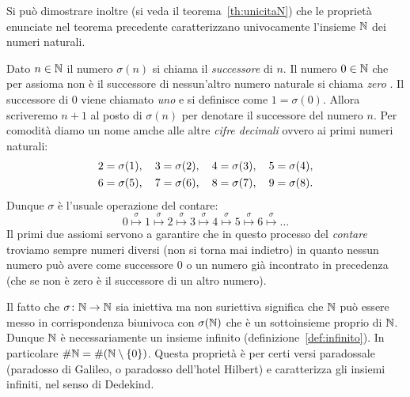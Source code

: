 Si può dimostrare inoltre (si veda il teorema~\ref{th:unicitaN}) che le proprietà 
enunciate nel teorema precedente caratterizzano univocamente l'insieme 
${\mathbb N}$ dei numeri naturali.

Dato $n\in {\mathbb N}$ il numero $\sigma(n)$ si chiama il \emph{successore}%
%
 di $n$. 
Il numero $0\in {\mathbb N}$ che per assioma non è il successore di nessun'altro 
numero naturale si chiama \emph{zero}%
%
. 
Il successore di $0$ viene chiamato \emph{uno} e si definisce 
come $1=\sigma(0)$. 
Allora scriveremo $n+1$ al posto di $\sigma(n)$ per denotare 
il successore del numero $n$.
Per comodità diamo un nome amche alle altre \emph{cifre decimali}%
%
ovvero ai primi numeri naturali:
\begin{equation}\label{eq:cifre}
\begin{gathered}
 2 = \sigma(1),\quad
 3 = \sigma(2),\quad 
 4 = \sigma(3),\quad
 5 = \sigma(4),\\ 
 6 = \sigma(5),\quad 
 7 = \sigma(6),\quad 
 8 = \sigma(7),\quad 
 9 = \sigma(8).
\end{gathered}
\end{equation}
Dunque $\sigma$ è l'usuale operazione del contare:
 \[
 0 \stackrel\sigma\mapsto 1 \stackrel\sigma\mapsto 2 \stackrel\sigma\mapsto 
 3 \stackrel\sigma\mapsto 4 \stackrel\sigma\mapsto 5 \stackrel\sigma\mapsto 
 6 \stackrel\sigma\mapsto \dots  
 \]
Il primi due assiomi servono a garantire che in questo processo del \emph{contare}%
%
troviamo sempre numeri diversi (non si torna mai indietro) in quanto nessun numero 
può avere come successore $0$ o un numero già incontrato in precedenza (che 
se non è zero è il successore di un altro numero).

Il fatto che $\sigma\colon {\mathbb N}\to {\mathbb N}$ sia iniettiva ma non suriettiva 
significa che ${\mathbb N}$ può essere messo in corrispondenza biunivoca con 
$\sigma({\mathbb N})$ che è un sottoinsieme proprio di ${\mathbb N}$.
Dunque ${\mathbb N}$ è necessariamente un insieme infinito 
(definizione~\ref{def:infinito}).
In particolare $\#{\mathbb N} = \#{\left( {\mathbb N} \setminus{\left\{ 0 \right\}} \right)}$.
Questa proprietà è per certi versi paradossale
(paradosso di Galileo, o paradosso dell'hotel Hilbert)
%
%
%
%
e caratterizza gli 
insiemi infiniti, nel senso di Dedekind.%
%

